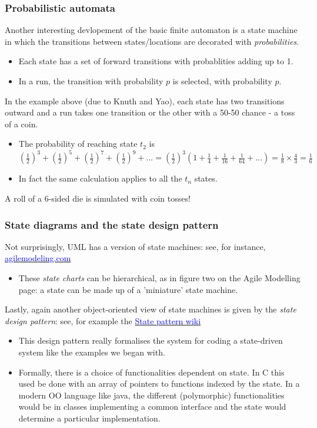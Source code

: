 \documentclass[10pt, hyperref={pdfpagelabels=false}]{beamer}
\begin{document}
\begin{frame}
\frametitle{Probabilistic automata}
Another interesting devlopement of the basic finite automaton is a state machine in which the transitions between states/locations are decorated with \emph{probabilities}.
\begin{itemize}
\item Each state has a set of forward transitions with probablities adding up to 1. 
\item In a run, the transition with probability $p$ is selected, with probability $p$.
\end{itemize}

In the example above (due to Knuth and Yao), each state has two transitions outward and a run takes one transition or the other with a 50-50 chance - a toss of a coin.
\begin{itemize}
\item The probability of reaching state $t_2$ is $(\frac{1}{2})^3 + (\frac{1}{2})^5 + (\frac{1}{2})^7 + (\frac{1}{2})^9 + ... = (\frac{1}{2})^3 (1 + \frac{1}{4} + \frac{1}{16} + \frac{1}{64} + ...) = \frac{1}{8} \times \frac{4}{3} = \frac{1}{6}$
\item In fact the same calculation applies to all the $t_n$ states.
\end{itemize}
A roll of a 6-sided die is simulated with coin tosses!
\end{frame}

\begin{frame}
\frametitle{State diagrams and the state design pattern}
Not surprisingly, UML has a version of state machines: see, for instance, \href{http://www.agilemodeling.com/artifacts/stateMachineDiagram.htm}{\textcolor{blue}{agilemodeling.com}}
\begin{itemize}
\item These \emph{state charts} can be hierarchical, as in figure two on the Agile Modelling page: a state can be made up of a 'miniature' state machine.
\end{itemize}

Lastly, again another object-oriented view of state machines is given by the \emph{state design pattern}: see, for example the \href{https://en.wikipedia.org/wiki/State_pattern}{\textcolor{blue}{State pattern wiki}}
\begin{itemize}
\item This design pattern really formalises the system for coding a state-driven system like the examples we began with.
\item Formally, there is a choice of functionalities dependent on state. In C this used be done with an array of pointers to functions indexed by the state. In a modern OO language like java, the different (polymorphic) functionalities would be in classes implementing a common interface and the state would determine a particular implementation.
\end{itemize}
\end{frame}
\end{document}
